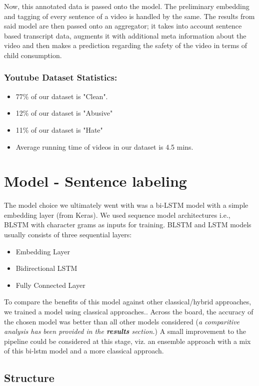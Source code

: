 \documentclass{article}[A4]
\begin{document}
Now, this annotated data is passed onto the model. The preliminary embedding and tagging of every sentence of a video is handled by the same. The results from said model are then passed onto an aggregator; it takes into account sentence based transcript data, augments it with additional meta information about the video and then makes a prediction regarding the safety of the video in terms of child consumption.
\subsubsection{Youtube Dataset Statistics:}
\begin{itemize}
	\item{77\% of our dataset is "Clean".}
	\item{12\% of our dataset is "Abusive"}
	\item{11\% of our dataset is "Hate"}
	\item{Average running time of videos in our dataset is 4.5 mins.}
\end{itemize}
\section{Model - Sentence labeling}

The model choice we ultimately went with was a bi-LSTM model with a simple embedding layer (from Keras). We used sequence model architectures i.e., BLSTM with character grams as inputs for training. BLSTM and LSTM models usually consists of three sequential layers:
\begin{itemize}
	\item{Embedding Layer}
	\item{Bidirectional LSTM}
	\item{Fully Connected Layer}
\end{itemize}

To compare the benefits of this model against other classical/hybrid approaches, we trained a model using classical approaches.\citep{hateoffensive}. Across the board, the accuracy of the chosen model was better than all other models considered (\textit{a comparitive analysis has been provided in the \textbf{results} section.}) A small improvement to the pipeline could be considered at this stage, viz. an ensemble approach with a mix of this bi-lstm model and a more classical approach.

\subsection{Structure}
\end{document}
